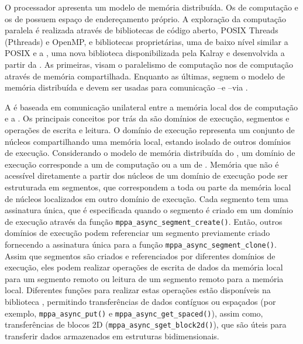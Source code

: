 O processador apresenta um modelo de memória distribuída. Os \clusters de computação e os \clusters de \io possuem espaço de endereçamento próprio. A exploração da computação paralela 
é realizada através de bibliotecas de código aberto, POSIX Threads (Pthreads) e OpenMP, e bibliotecas proprietárias, uma de baixo nível similar a POSIX \ipc e a \async, uma nova biblioteca disponibilizada pela Kalray e desenvolvida a partir da \ipc. As primeiras, visam o paralelismo de computação nos \clusters de computação através de memória compartilhada. Enquanto as últimas, seguem o modelo de memória distribuída e devem ser usadas para comunicação \cluster--\cluster e \cluster--\io via \noc.

A \async é baseada em comunicação unilateral entre a memória local dos \clusters de computação e a \lpddr. Os principais conceitos por trás da \async são domínios de execução, segmentos e operações de escrita e leitura. O domínio de execução representa um conjunto de núcleos compartilhando uma memória local, estando isolado de outros domínios de execução. Considerando o modelo de memória distribuída do \mppa, um domínio de execução corresponde a um \cluster de computação ou a um \cluster de \io. Memória que não é acessível diretamente a partir dos núcleos de um domínio de execução pode ser estruturada em segmentos, que correspondem a toda ou parte da memória local de núcleos localizados em outro domínio de execução. Cada segmento tem uma assinatura única, que é especificada quando o segmento é criado em um domínio de execução através da função \texttt{mppa\_async\_segment\_create()}. Então, outros domínios de execução podem referenciar um segmento previamente criado fornecendo a assinatura única para a função \texttt{mppa\_async\_segment\_clone()}. Assim que segmentos são criados e referenciados por diferentes domínios de execução, eles podem realizar operações de escrita de dados da memória local para um segmento remoto ou leitura de um segmento remoto para a memória local.
Diferentes funções para realizar estas operações estão disponíveis na biblioteca \async, permitindo transferências de dados contíguos ou espaçados (por exemplo, \texttt{mppa\_async\_put()} e \texttt{mppa\_async\_get\_spaced()}), assim como, transferências de blocos 2D (\texttt{mppa\_async\_sget\_block2d()}), que são úteis para transferir dados armazenados em estruturas bidimensionais.


